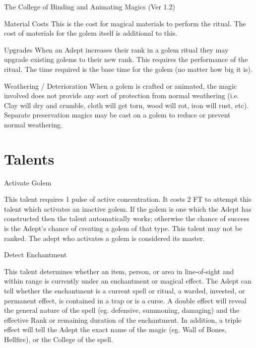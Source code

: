 \begin{Chapter}{The College of Binding and Animating Magics (Ver 1.2)}
\begin{Description}
\item[Material Costs] This is the cost for magical materials to
  perform the ritual.  The cost of materials for the golem itself is
  additional to this.

\item[Upgrades] When an Adept increases their rank in a golem ritual
  they may upgrade existing golems to their new rank.  This requires
  the performance of the ritual. The time required is the base time
  for the golem (no matter how big it is).

\item[Weathering / Deterioration] When a golem is crafted or animated,
  the magic involved does not provide any sort of protection from
  normal weathering (i.e. Clay will dry and crumble, cloth will get
  torn, wood will rot, iron will rust, etc).  Separate preservation
  magics may be cast on a golem to reduce or prevent normal
  weathering.

\end{Description}


\section{Talents}

\begin{talent}[T-1]{Activate Golem}

\begin{effects}
This talent requires 1 pulse of active concentration. It costs 2 FT to
attempt this talent which activates an inactive golem.  If the golem
is one which the Adept has constructed then the talent automatically
works; otherwise the chance of success is the Adept’s chance of
creating a golem of that type. This talent may not be ranked. The
adept who activates a golem is considered its master.
\end{effects}
\end{talent}

\begin{talent}[T-2]{Detect Enchantment}

\begin{effects}
This talent determines whether an item, person, or area in
line-of-sight and within range is currently under an enchantment or
magical effect.  The Adept can tell whether the enchantment is a
current spell or ritual, a warded, invested, or permanent effect, is
contained in a trap or is a curse. A double effect will reveal the
general nature of the spell (eg.  defensive, summoning, damaging) and
the effective Rank or remaining duration of the enchantment. In
addition, a triple effect will tell the Adept the exact name of the
magic (eg.  Wall of Bones, Hellfire), or the College of the spell.


\end{effects}
\end{talent}
\end{Chapter}
